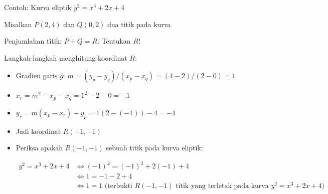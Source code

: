 \documentclass{article}
\begin{document}

Contoh: Kurva eliptik $y^2 = x^3 + 2x + 4$

Misalkan $P(2, 4)$ dan $Q(0, 2)$ dua titik pada kurva

Penjumlahan titik: $P + Q = R$. Tentukan $R$!

Langkah-langkah menghitung koordinat $R$:

\begin{itemize}
    \item Gradien garis $g$: $m = (y_p - y_q)/(x_p - x_q) = (4 - 2)/(2 - 0) = 1$
    \item $x_r = m^2 - x_p - x_q = 1^2 - 2 - 0 = -1$
    \item $y_r = m(x_p - x_r) - y_p = 1(2 - (-1)) - 4 = -1$
    \item Jadi koordinat $R(-1, -1)$
    \item Periksa apakah $R(-1, -1)$ sebuah titik pada kurva eliptik:
    
    \begin{align*}
    y^2 = x^3 + 2x + 4 & \Leftrightarrow (-1)^2 = (-1)^3 + 2(-1) + 4 \\
    & \Leftrightarrow 1 = -1 - 2 + 4 \\
    & \Leftrightarrow 1 = 1 \text{ (terbukti } R(-1, -1) \text{ titik yang terletak pada kurva } y^2 = x^3 + 2x + 4)\
    \end{align*}
\end{itemize}
\end{document}
